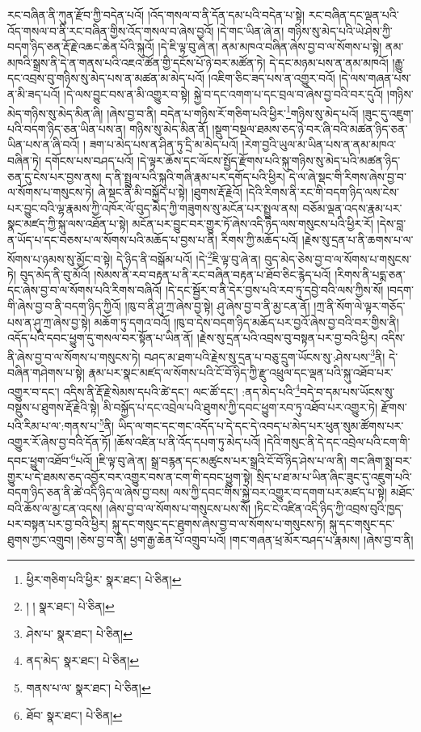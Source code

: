 རང་བཞིན་ནི་ཀུན་རྫོབ་ཀྱི་བདེན་པའོ། །འོད་གསལ་བ་ནི་དོན་དམ་པའི་བདེན་པ་སྟེ། རང་བཞིན་དང་ལྡན་པའི་འོད་གསལ་བ་ནི་རང་བཞིན་གྱིས་འོད་གསལ་བ་ཞེས་བྱའོ། །དེ་གང་ཡིན་ཞེ་ན། གཉིས་སུ་མེད་པའི་ཡེ་ཤེས་ཀྱི་བདག་ཉིད་ཅན་རྡོ་རྗེ་འཆང་ཆེན་པོའི་སྐུའོ། །དེ་ཇི་ལྟ་བུ་ཞེ་ན། ནམ་མཁའ་བཞིན་ཞེས་བྱ་བ་ལ་སོགས་པ་སྟེ། ནམ་མཁའི་སྒྲས་ནི་དེ་ན་གནས་པའི་འཇའ་ཚོན་གྱི་དངོས་པོ་ཉེ་བར་མཚོན་ཏེ། དེ་དང་མཉམ་པས་ན་ནམ་མཁའོ། །རྒྱུ་དང་འབྲས་བུ་གཉིས་སུ་མེད་པས་ན་མཚན་མ་མེད་པའོ། །འཇིག་ཅིང་ཟད་པས་ན་འགྱུར་བའོ། །དེ་ལས་གཞན་པས་ན་མི་ཟད་པའོ། །དེ་ལས་བྱུང་བས་ན་མི་འགྱུར་བ་སྟེ། སྐྱེ་བ་དང་འགག་པ་དང་བྲལ་བ་ཞེས་བྱ་བའི་བར་དུའོ། །གཉིས་མེད་གཉིས་སུ་མེད་མིན་ཞི། །ཞེས་བྱ་བ་ནི། བདེན་པ་གཉིས་རོ་གཅིག་པའི་ཕྱིར་\footnote{ཕྱིར་གཅིག་པའི་ཕྱིར་  སྣར་ཐང་།  པེ་ཅིན། }གཉིས་སུ་མེད་པའོ། །ཟུང་དུ་འཇུག་པའི་བདག་ཉིད་ཅན་ཡིན་པས་ན། གཉིས་སུ་མེད་མིན་ནོ། །སྡུག་བསྔལ་ཐམས་ཅད་ཉེ་བར་ཞི་བའི་མཚན་ཉིད་ཅན་ཡིན་པས་ན་ཞི་བའོ། །
ཟག་པ་མེད་པས་ན་ཤིན་ཏུ་དྲི་མ་མེད་པའོ། །རེག་བྱའི་ཡུལ་མ་ཡིན་པས་ན་ནམ་མཁའ་བཞིན་ཏེ། དགོངས་པས་བཤད་པའོ། །དེ་ལྟར་ཆོས་དང་ལོངས་སྤྱོད་རྫོགས་པའི་སྐུ་གཉིས་སུ་མེད་པའི་མཚན་ཉིད་ཅན་དུ་ངེས་པར་བྱས་ནས། ད་ནི་སྤྲུལ་པའི་སྐུའི་གཞི་རྣམ་པར་དགོད་པའི་ཕྱིར། དེ་ལ་ཞེ་སྡང་གི་རིགས་ཞེས་བྱ་བ་ལ་སོགས་པ་གསུངས་ཏེ། ཞེ་སྡང་ནི་མི་བསྐྱོད་པ་སྟེ། །ཐུགས་རྡོ་རྗེའོ། །དེའི་རིགས་ནི་རང་གི་བདག་ཉིད་ལས་ངེས་པར་བྱུང་བའི་ལྷ་རྣམས་ཀྱི་འཁོར་ལོ་བུད་མེད་ཀྱི་གཟུགས་སུ་མངོན་པར་སྤྲུལ་ནས། བཅོམ་ལྡན་འདས་རྣམ་པར་སྣང་མཛད་ཀྱི་སྐུ་ལས་འཐོན་པ་སྟེ། མངོན་པར་བྱུང་བར་གྱུར་ཏོ་ཞེས་འདི་ཉིད་ལས་གསུངས་པའི་ཕྱིར་རོ། །དེས་བླ་ན་ཡོད་པ་དང་བཅས་པ་ལ་སོགས་པའི་མཆོད་པ་བྱས་པ་ནི། རིགས་ཀྱི་མཆོད་པའོ། །རྗེས་སུ་དྲན་པ་ནི་ཆགས་པ་ལ་སོགས་པ་ཉམས་སུ་མྱོང་བ་སྟེ། དེ་ཉིད་ནི་བསྒོམ་པའོ། །དེ་\footnote{། །  སྣར་ཐང་།  པེ་ཅིན། }ཇི་ལྟ་བུ་ཞེ་ན། བུད་མེད་ཅེས་བྱ་བ་ལ་སོགས་པ་གསུངས་ཏེ། བུད་མེད་ནི་བུ་མོའོ། །སེམས་ནི་རབ་བརྟན་པ་ནི་རང་བཞིན་བརྟན་པ་ཐོབ་ཅིང་རྙེད་པའོ། །རིགས་ནི་པདྨ་ཅན་དང་ཞེས་བྱ་བ་ལ་སོགས་པའི་རིགས་བཞིའོ། །དེ་དང་སྦྱོར་བ་ནི་དེར་བྱས་པའི་རབ་ཏུ་དབྱེ་བའི་ལས་ཀྱིས་སོ། །བདག་གི་ཞེས་བྱ་བ་ནི་བདག་ཉིད་ཀྱིའོ། །ཁུ་བ་ནི་ཤུ་ཀྲ་ཞེས་བྱ་སྟེ། ཤུ་ཞེས་བྱ་བ་ནི་མྱ་ངན་ནོ། །ཀྲ་ནི་སོག་ལེ་ལྟར་གཅོད་པས་ན་ཤུ་ཀྲ་ཞེས་བྱ་སྟེ། མཆོག་ཏུ་དགའ་བའོ། །ཁུ་བ་དེས་བདག་ཉིད་མཆོད་པར་བྱའོ་ཞེས་བྱ་བའི་བར་གྱིས་ནི། འདོད་པའི་དབང་ཕྱུག་དུ་གསལ་བར་སྟོན་པ་ཡིན་ནོ། །རྗེས་སུ་དྲན་པའི་འབྲས་བུ་བསྟན་པར་བྱ་བའི་ཕྱིར། འདིས་ནི་ཞེས་བྱ་བ་ལ་སོགས་པ་གསུངས་ཏེ། བཤད་མ་ཐག་པའི་རྗེས་སུ་དྲན་པ་བཅུ་དྲུག་ཡོངས་སུ་:ཤེས་པས་\footnote{ཤེས་པ་  སྣར་ཐང་།  པེ་ཅིན། }ནི། དེ་བཞིན་གཤེགས་པ་སྟེ། རྣམ་པར་སྣང་མཛད་ལ་སོགས་པའི་ངོ་བོ་ཉིད་ཀྱི་རྫུ་འཕྲུལ་དང་ལྡན་པའི་སྐུ་འཐོབ་པར་འགྱུར་བ་དང་། འདིས་ནི་རྡོ་རྗེ་སེམས་དཔའི་ཚེ་དང་། ལང་ཚོ་དང་། :ནད་མེད་པའི་\footnote{ནད་མེད་  སྣར་ཐང་།  པེ་ཅིན། }བདེ་བ་དམ་པས་ཡོངས་སུ་བསྡུས་པ་ཐུགས་རྡོ་རྗེའི་སྟེ། མི་བསྐྱོད་པ་དང་འབྲེལ་པའི་ཐུགས་ཀྱི་དབང་ཕྱུག་རབ་ཏུ་འཐོབ་པར་འགྱུར་ཏེ། རྫོགས་པའི་རིམ་པ་ལ་:གནས་པ་\footnote{གནས་པ་ལ་  སྣར་ཐང་།  པེ་ཅིན། }ནི། ཡིད་ལ་གང་དང་གང་འདོད་པ་དེ་དང་དེ་འབད་པ་མེད་པར་ཕུན་སུམ་ཚོགས་པར་འགྱུར་རོ་ཞེས་བྱ་བའི་དོན་ཏོ། །ཆོས་འཛིན་པ་ནི་འོད་དཔག་ཏུ་མེད་པའོ། །དེའི་གསུང་ནི་དེ་དང་འབྲེལ་པའི་ངག་གི་དབང་ཕྱུག་འཐོབ་\footnote{ཐོབ་  སྣར་ཐང་།  པེ་ཅིན། }པའོ། །ཇི་ལྟ་བུ་ཞེ་ན། སྒྲ་བརྙན་དང་མཚུངས་པར་སྒྲའི་ངོ་བོ་ཉིད་ཤེས་པ་ལ་ནི། གང་ཞིག་སྨྲ་བར་གྱུར་པ་དེ་ཐམས་ཅད་འབྱོར་བར་འགྱུར་བས་ན་ངག་གི་དབང་ཕྱུག་སྟེ། སྲིད་པ་ཐ་མ་པ་ཡིན་ཞིང་ཟུང་དུ་འཇུག་པའི་བདག་ཉིད་ཅན་ནི་ཚེ་འདི་ཉིད་ལ་ཞེས་བྱ་བས། ལས་ཀྱི་དབང་གིས་སྐྱེ་བར་འགྱུར་བ་དགག་པར་མཛད་པ་སྟེ། མཐོང་བའི་ཆོས་ལ་མྱ་ངན་འདས། །ཞེས་བྱ་བ་ལ་སོགས་པ་གསུངས་པས་སོ། །ཏིང་ངེ་འཛིན་འདི་ཉིད་ཀྱི་འབྲས་བུའི་ཁྱད་པར་བསྟན་པར་བྱ་བའི་ཕྱིར། སྐུ་དང་གསུང་དང་ཐུགས་ཞེས་བྱ་བ་ལ་སོགས་པ་གསུངས་ཏེ། སྐུ་དང་གསུང་དང་ཐུགས་ཀྱང་འགྲུབ། །ཅེས་བྱ་བ་ནི། ཕྱག་རྒྱ་ཆེན་པོ་འགྲུབ་པའོ། །གང་གཞན་ཕྲ་མོར་བཤད་པ་རྣམས། །ཞེས་བྱ་བ་ནི། 